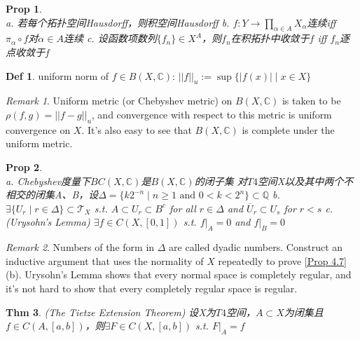 \documentclass[hidelinks]{article}
\theoremstyle{definition}
\newtheorem*{defin}{Def}
\theoremstyle{plain}
\newtheorem{theorem}{Thm}[section]
\newtheorem{proposition}[theorem]{Prop}
\theoremstyle{remark}
\newtheorem*{remark}{Remark}
\begin{document}
\begin{proposition}~\\
a. 若每个拓扑空间Hausdorff，则积空间Hausdorff\newline
b. $f:Y\to \prod_{\alpha \in A}X_\alpha$连续iff $\pi_\alpha \circ f$对$\alpha \in A$连续 \newline
c. 设函数项数列$\{f_n\}\in X^A$，则$f_n$在积拓扑中收敛于$f$ iff $f_n$逐点收敛于$f$
\end{proposition}

\begin{defin}
uniform norm of $f\in B(X,\mathbb{C})$: $||f||_u:=\sup{\{|f(x)|\mid x\in X\}}$
\end{defin}

\begin{remark}
Uniform metric (or Chebyshev metric) on $B(X,\mathbb{C})$ is taken to be $\rho(f,g)=||f-g||_u$, and convergence with respect to this metric is uniform convergence on $X$. It's also easy to see that $B(X,\mathbb{C})$ is complete under the uniform metric.
\end{remark}

\begin{proposition}~\\ \label{Prop 4.7}
a. Chebyshev度量下$BC(X,\mathbb{C})$是$B(X,\mathbb{C})$的闭子集 \newline
对$T4$空间X以及其中两个不相交的闭集A、B，设$\Delta=\{k2^{-n}\mid n\geq 1 \textrm{ and } 0<k<2^n\}\subset \mathbb{Q}$ \newline
b. $\exists \{U_r\mid r\in \Delta\}\subset \mathscr{T}_X $ s.t. $A\subset U_r\subset B^c$ for all $r\in \Delta$ and $\overline{U}_r\subset U_s$ for $r<s$ \newline
c. (Urysohn's Lemma) $\exists f\in C(X,[0,1])$ s.t. $\left.f\right|_A=0$ and $\left.f\right|_B=0$
\end{proposition}

\begin{remark}
Numbers of the form in $\Delta$ are called dyadic numbers. Construct an inductive argument that uses the normality of $X$ repeatedly to prove \autoref{Prop 4.7} (b). Urysohn's Lemma shows that every normal space is completely regular, and it's not hard to show that every completely regular space is regular.
\end{remark}

\begin{theorem} (The Tietze Extension Theorem) \newline
设X为$T4$空间，$A\subset X$为闭集且$f\in C(A,[a,b])$，则$\exists F\in C(X,[a,b])$ s.t. $\left.F\right|_A=f$
\end{theorem}
\end{document}
